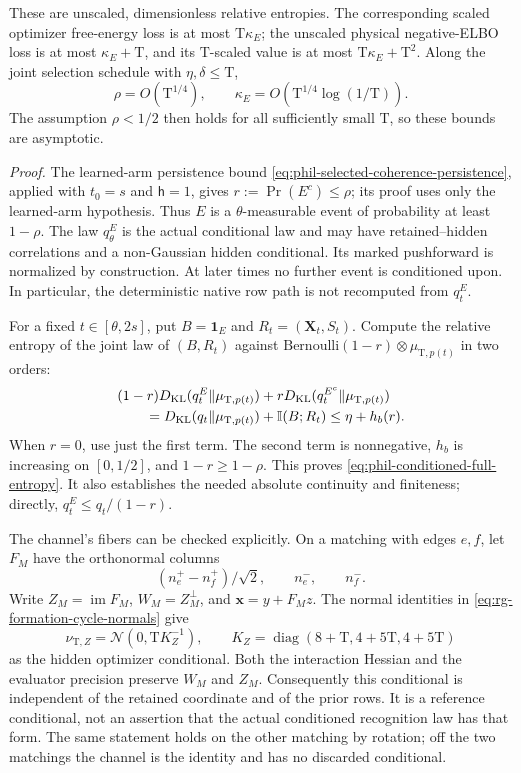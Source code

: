 These are unscaled, dimensionless relative entropies. The corresponding
scaled optimizer free-energy loss is at most \(\mathrm T\kappa_E\);
the unscaled physical negative-ELBO loss is at most
\(\kappa_E+\mathrm T\), and its \(\mathrm T\)-scaled value is at most
\(\mathrm T\kappa_E+\mathrm T^2\).
Along the joint selection schedule with \(\eta,\delta\le\mathrm T\),
\[
 \rho=O(\mathrm T^{1/4}),
 \qquad
 \kappa_E=O(\mathrm T^{1/4}\log(1/\mathrm T)).
\]
The assumption \(\rho<1/2\) then holds for all sufficiently small
\(\mathrm T\), so these bounds are asymptotic.

\noindent\emph{Proof.}
The learned-arm persistence bound
\cref{eq:phil-selected-coherence-persistence}, applied with
\(t_0=s\) and \(\mathsf h=1\), gives \(r:=\Pr(E^c)\le\rho\); its
proof uses only the learned-arm hypothesis. Thus \(E\) is a
\(\theta\)-measurable event of probability at least \(1-\rho\).
The law \(q_\theta^E\) is the actual conditional law and may have
retained--hidden correlations and a non-Gaussian hidden conditional.
Its marked pushforward is normalized by construction. At later times
no further event is conditioned upon. In particular, the deterministic
native row path is not recomputed from \(q_t^E\).

For a fixed \(t\in[\theta,2s]\), put
\(B=\mathbf1_E\) and \(R_t=(\mathbf X_t,S_t)\).
Compute the relative entropy of the joint law of \((B,R_t)\) against
\(\mathrm{Bernoulli}(1-r)\otimes\mu_{\mathrm T,p(t)}\) in two orders:
\begin{equation}
 \begin{aligned}
 &(1-r)D_{\mathrm{KL}}(q_t^E\Vert\mu_{\mathrm T,p(t)})
       +rD_{\mathrm{KL}}(q_t^{E^c}\Vert\mu_{\mathrm T,p(t)})\\
 &\qquad=D_{\mathrm{KL}}(q_t\Vert\mu_{\mathrm T,p(t)})
                       +\mathbb I(B;R_t)
 \le\eta+h_b(r).
 \end{aligned}
 \label{eq:phil-conditioned-event-information}
\end{equation}
When \(r=0\), use just the first term. The second term is nonnegative,
\(h_b\) is increasing on \([0,1/2]\), and \(1-r\ge1-\rho\).
This proves \cref{eq:phil-conditioned-full-entropy}.
It also establishes the needed absolute continuity and finiteness;
directly, \(q_t^E\le q_t/(1-r)\).

The channel's fibers can be checked explicitly. On a matching with
edges \(e,f\), let \(F_M\) have the orthonormal columns
\[
 (n_e^+-n_f^+)/\sqrt2,\qquad n_e^-,\qquad n_f^-.
\]
Write \(Z_M=\operatorname{im}F_M\), \(W_M=Z_M^\perp\), and
\(\mathbf x=y+F_Mz\).
The normal identities in \cref{eq:rg-formation-cycle-normals} give
\[
 \nu_{\mathrm T,Z}=\mathcal N(0,\mathrm TK_Z^{-1}),
 \qquad
 K_Z=\operatorname{diag}(8+\mathrm T,4+5\mathrm T,4+5\mathrm T)
\]
as the hidden optimizer conditional. Both the interaction Hessian
and the evaluator precision preserve \(W_M\) and \(Z_M\).
Consequently this conditional is independent of the retained
coordinate and of the prior rows. It is a reference conditional, not
an assertion that the actual conditioned recognition law has that
form. The same statement holds on the other matching by rotation;
off the two matchings the channel is the identity and has no
discarded conditional.

